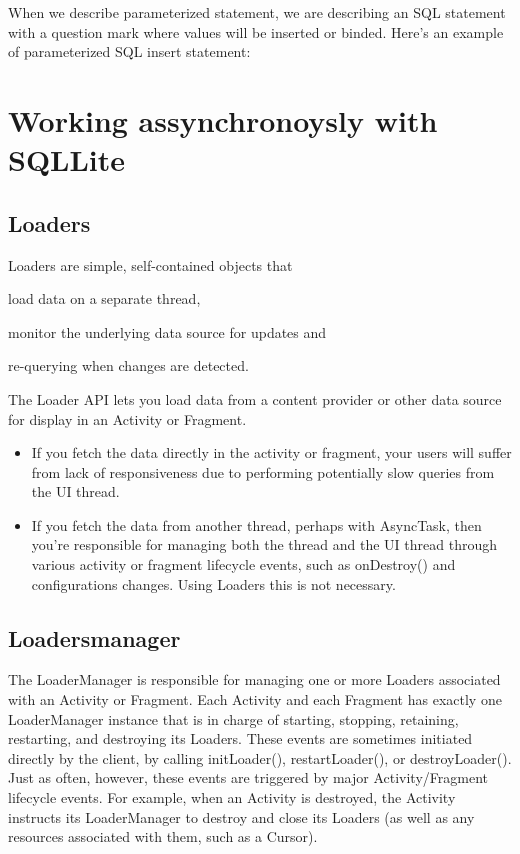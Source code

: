 When we describe parameterized statement, we are describing an SQL statement with a question mark where values will be inserted or binded. Here's an example of parameterized SQL insert statement:

\section{Working assynchronoysly with SQLLite}
\subsection{Loaders}
Loaders \cite{Lockwood2012} are  simple, self-contained objects that 
\begin{inparaenum}[(i)]
	\item load data on a separate thread, 
	\item monitor the underlying data source for updates and
	\item  re-querying when changes are detected.
\end{inparaenum}

 The Loader API lets you load data from a content provider or other data source for display in an Activity or Fragment.
\begin{itemize}
	\item If you fetch the data directly in the activity or fragment, your users will suffer from lack of responsiveness due to performing potentially slow queries from the UI thread.
	\item If you fetch the data from another thread, perhaps with AsyncTask, then you're responsible for managing both the thread and the UI thread through various activity or fragment lifecycle events, such as onDestroy() and configurations changes. Using Loaders this is not necessary.
\end{itemize}

\subsection{Loadersmanager}
The LoaderManager is responsible for managing one or more Loaders associated with an Activity or Fragment. Each Activity and each Fragment has exactly one LoaderManager instance that is in charge of starting, stopping, retaining, restarting, and destroying its Loaders. These events are sometimes initiated directly by the client, by calling initLoader(), restartLoader(), or destroyLoader(). Just as often, however, these events are triggered by major Activity/Fragment lifecycle events. For example, when an Activity is destroyed, the Activity instructs its LoaderManager to destroy and close its Loaders (as well as any resources associated with them, such as a Cursor).

